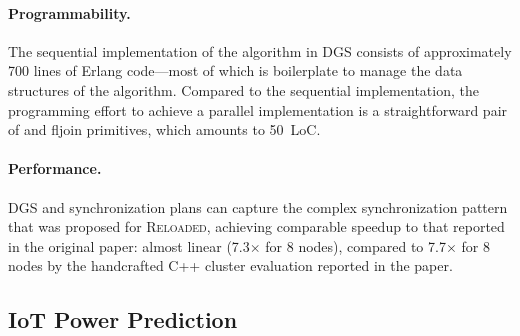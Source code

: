 \paragraph{Programmability.}
The sequential implementation of the algorithm in DGS consists of approximately 700
lines of Erlang code---most of which is boilerplate to manage the
data structures of the algorithm.
Compared to the sequential implementation, the programming effort to achieve a
parallel implementation is a straightforward pair of  and fl{join} primitives, which amounts to 50~LoC.

\paragraph{Performance.}
DGS and synchronization plans can capture the complex synchronization pattern that was proposed for \textsc{Reloaded}, achieving comparable speedup to that reported in the original paper:
almost linear (7.3$\times$ for 8 nodes), compared to 7.7$\times$ for 8 nodes by the handcrafted C++ cluster evaluation reported in the paper.

\subsection{IoT Power Prediction}
\label{dgs:ssec:iot-case-study}

